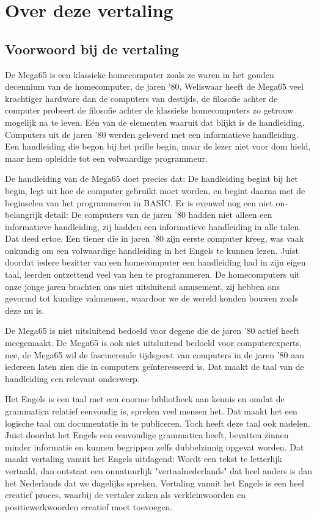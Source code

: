 \chapter{Over deze vertaling}
\label{cha:translation-about}

\section{Voorwoord bij de vertaling}

De Mega65 is een klassieke homecomputer zoals ze waren in het gouden decennium van de homecomputer, de jaren '80.
Weliswaar heeft de Mega65 veel krachtiger hardware dan de computers van destijds, de filosofie achter de computer probeert
de filosofie achter de klassieke homecomputers zo getrouw mogelijk na te leven. Eén van de elementen waaruit dat blijkt
is de handleiding. Computers uit de jaren '80 werden geleverd met een informatieve handleiding. Een handleiding die begon
bij het prille begin, maar de lezer niet voor dom hield, maar hem opleidde tot een volwaardige programmeur.

De handleiding van de Mega65 doet precies dat: De handleiding begint bij het begin, legt uit hoe de computer gebruikt moet
worden, en begint daarna met de beginselen van het programmeren in BASIC. Er is evenwel nog een niet on-belangrijk detail: De
computers van de jaren '80 hadden niet alleen een informatieve handleiding, zij hadden een informatieve handleiding in
alle talen. Dat deed ertoe. Een tiener die in jaren '80 zijn eerste computer kreeg, was vaak onkundig om een volwaardige
handleiding in het Engels te kunnen lezen. Juist doordat iedere bezitter van een homecomputer een handleiding had in zijn
eigen taal, leerden ontzettend veel van hen te programmeren. De homecomputers uit onze jonge jaren brachten ons niet
uitsluitend amusement, zij hebben ons gevormd tot kundige vakmensen, waardoor we de wereld konden bouwen zoals deze nu is.

De Mega65 is niet uitsluitend bedoeld voor degene die de jaren '80 actief heeft meegemaakt. De Mega65 is ook niet uitsluitend
bedoeld voor computerexperts, nee, de Mega65 wil de fascinerende tijdsgeest van computers in de jaren '80 aan iedereen laten
zien die in computers geïnteresseerd is. Dat maakt de taal van de handleiding een relevant onderwerp.

Het Engels is een taal met een enorme bibliotheek aan kennis en omdat de grammatica relatief eenvoudig is, spreken veel
mensen het. Dat maakt het een logische taal om documentatie in te publiceren. Toch heeft deze taal ook nadelen. Juist
doordat het Engels een eenvoudige grammatica heeft, bevatten zinnen minder informatie en kunnen begrippen zelfs dubbelzinnig
opgevat worden. Dat maakt vertaling vanuit het Engels uitdagend: Wordt een tekst te letterlijk vertaald, dan ontstaat een
onnatuurlijk "vertaalnederlands" dat heel anders is dan het Nederlands dat we dagelijks spreken. Vertaling vanuit het Engels
is een heel creatief proces, waarbij de vertaler zaken als verkleinwoorden en positiewerkwoorden creatief moet toevoegen.

